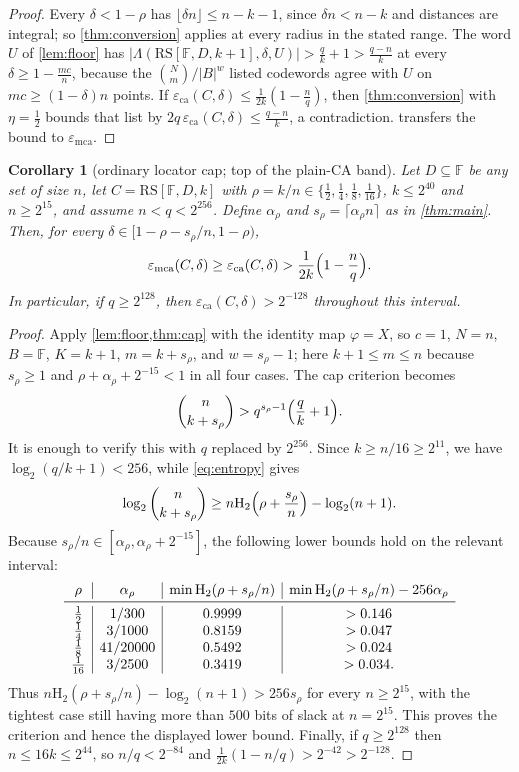 \documentclass[11pt]{amsart}
\newtheorem{corollary}[corollary]{Corollary}
\theoremstyle{definition}
\theoremstyle{remark}
\newcommand{\F}{\mathbb{F}}
\newcommand{\RS}{\mathrm{RS}}
\newcommand{\eca}{\varepsilon_{\mathrm{ca}}}
\newcommand{\emca}{\varepsilon_{\mathrm{mca}}}
\newcommand{\Lst}{\Lambda}
\newcommand{\Hb}{\mathrm{H}_2}
\begin{document}
\begin{proof}
Every $\delta<1-\rho$ has $\lfloor\delta n\rfloor\le n-k-1$, since $\delta n<n-k$ and distances are integral; so \cref{thm:conversion} applies at every radius in the stated range. The word $U$ of \cref{lem:floor} has $\bigl|\Lst(\RS[\F,D,k+1],\delta,U)\bigr|>\frac qk+1>\frac{q-n}k$ at every $\delta\ge1-\frac{mc}n$, because the $\binom Nm/|B|^w$ listed codewords agree with $U$ on $mc\ge(1-\delta)n$ points. If $\eca(C,\delta)\le\frac1{2k}(1-\frac nq)$, then \cref{thm:conversion} with $\eta=\frac12$ bounds that list by $2q\,\eca(C,\delta)\le\frac{q-n}k$, a contradiction.  transfers the bound to $\emca$.
\end{proof}

\begin{corollary}[ordinary locator cap; top of the plain-CA band]\label{cor:ordinary-top}
Let $D\subseteq\F$ be any set of size $n$, let $C=\RS[\F,D,k]$ with $\rho=k/n\in\{\tfrac12,\tfrac14,\tfrac18,\tfrac1{16}\}$, $k\le2^{40}$ and $n\ge2^{15}$, and assume $n<q<2^{256}$. Define $\alpha_\rho$ and $s_\rho=\lceil\alpha_\rho n\rceil$ as in \cref{thm:main}. Then, for every
$\delta\in[1-\rho-s_\rho/n,1-\rho)$,
\[
\emca(C,\delta)\ge\eca(C,\delta)>\frac1{2k}\Bigl(1-\frac nq\Bigr).
\]
In particular, if $q\ge2^{128}$, then $\eca(C,\delta)>2^{-128}$ throughout this interval.
\end{corollary}

\begin{proof}
Apply \cref{lem:floor,thm:cap} with the identity map $\varphi=X$, so $c=1$, $N=n$, $B=\F$, $K=k+1$, $m=k+s_\rho$, and $w=s_\rho-1$; here $k+1\le m\le n$ because $s_\rho\ge1$ and $\rho+\alpha_\rho+2^{-15}<1$ in all four cases. The cap criterion becomes
\[
\binom n{k+s_\rho}>q^{s_\rho-1}\Bigl(\frac qk+1\Bigr).
\]
It is enough to verify this with $q$ replaced by $2^{256}$. Since $k\ge n/16\ge2^{11}$, we have $\log_2(q/k+1)<256$, while \eqref{eq:entropy} gives
\[
\log_2\binom n{k+s_\rho}
\ge n\Hb\Bigl(\rho+\frac{s_\rho}{n}\Bigr)-\log_2(n+1).
\]
Because $s_\rho/n\in[\alpha_\rho,\alpha_\rho+2^{-15}]$, the following lower bounds hold on the relevant interval:
\[
\begin{array}{c|c|c|c}
\rho & \alpha_\rho & \min\Hb(\rho+s_\rho/n) & \min\Hb(\rho+s_\rho/n)-256\alpha_\rho\\
\midrule
\tfrac12 & 1/300 & 0.9999 & >0.146\\
\tfrac14 & 3/1000 & 0.8159 & >0.047\\
\tfrac18 & 41/20000 & 0.5492 & >0.024\\
\tfrac1{16} & 3/2500 & 0.3419 & >0.034.
\end{array}
\]
Thus $n\Hb(\rho+s_\rho/n)-\log_2(n+1)>256s_\rho$ for every $n\ge2^{15}$, with the tightest case still having more than $500$ bits of slack at $n=2^{15}$. This proves the criterion and hence the displayed lower bound. Finally, if $q\ge2^{128}$ then $n\le16k\le2^{44}$, so $n/q<2^{-84}$ and $\frac1{2k}(1-n/q)>2^{-42}>2^{-128}$.
\end{proof}
\end{document}
